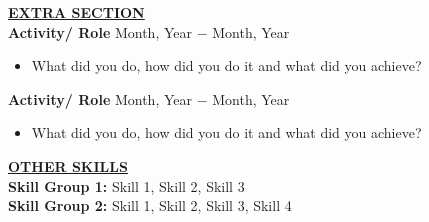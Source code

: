 \documentclass{article}
\begin{document}
\noindent \textbf{\underline{EXTRA SECTION}} \\
\noindent \textbf{Activity/ Role} \hfill Month, Year $-$ Month, Year
\begin{itemize}[noitemsep,nolistsep,leftmargin=*]
\item {What did you do, how did you do it and what did you achieve? \\}
\end{itemize}

\noindent \textbf{Activity/ Role} \hfill Month, Year $-$ Month, Year
\begin{itemize}[noitemsep,nolistsep,leftmargin=*]
\item {What did you do, how did you do it and what did you achieve? \\}
\end{itemize}

\noindent \textbf{\underline{OTHER SKILLS}} \\
\noindent \textbf{Skill Group 1:} Skill 1, Skill 2, Skill 3 \\
\noindent \textbf{Skill Group 2: } Skill 1, Skill 2, Skill 3, Skill 4
\end{document}

